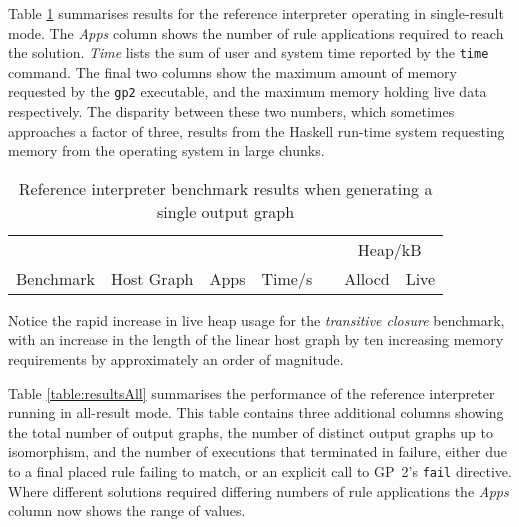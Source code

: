 Table \ref{table:resultsSingle} summarises results for the reference interpreter operating in single-result mode. The \textit{Apps} column shows the number of rule applications required to reach the solution. \textit{Time} lists the sum of user and system time reported by the \texttt{time} command. The final two columns show the maximum amount of memory requested by the \texttt{gp2} executable, and the maximum memory holding live data respectively. The disparity between these two numbers, which sometimes approaches a factor of three, results from the Haskell run-time system requesting memory from the operating system in large chunks.

\begin{table}[t]
\begin{minipage}{\textwidth}
\centering

\begin{tabular}{llrrcrr}
\hline 
&  & & & & \multicolumn{2}{c}{Heap/kB}\\
Benchmark          & Host Graph & Apps & Time/s   & & Allocd & Live \\
\hline 

\end{tabular}

\caption[Reference interpreter benchmarks]{Reference interpreter benchmark results when generating a single output graph}

\label{table:resultsSingle}
\end{minipage}
\end{table}




Notice the rapid increase in live heap usage for the \textit{transitive closure} benchmark, with an increase in the length of the linear host graph by ten increasing memory requirements by approximately an order of magnitude. %


Table \ref{table:resultsAll} summarises the performance of the reference interpreter running in all-result mode. This table contains three additional columns showing the total number of output graphs, the number of distinct output graphs up to isomorphism, and the number of executions that terminated in failure, either due to a final placed rule failing to match, or an explicit call to GP~2's \texttt{fail} directive. Where different solutions required differing numbers of rule applications the \textit{Apps} column now shows the range of values.


